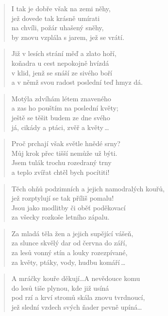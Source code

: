 \documentclass{book}
\begin{document}
\begin{verse}
I tak je dobře však na zemi něhy,\\
jež dovede tak krásně umírati\\
na chvíli, požár uhašený sněhy,\\
by znovu vzplála s jarem, jež se vrátí.
\end{verse}
\begin{verse}
Již v lesích strání měď a zlato hoří,\\
koňadra u cest nepokojně hvízdá\\
v klid, jenž se snáší ze sivého boří\\
a v němž svou radost poslední teď hmyz dá.
\end{verse}
\begin{verse}
Motýla zdvíhám létem znaveného\\
a zas ho pouštím na poslední květy;\\
ještě se těšit budem ze dne svého\\
já, cikády a ptáci, zvěř a květy\,\ldots
\end{verse}
\begin{verse}
Proč prchají však světle hnědé srny?\\
Můj krok přec tišší nemůže už býti.\\
Jsem tulák trochu rozedraný trny\\
a teplo zvířat chtěl bych pocítiti!
\end{verse}
\newpage
{}
\begin{verse}
Těch ohňů podzimních a jejich namodralých kouřů,\\
jež rozptylují se tak příliš pomalu!\\
Jsou jako modlitby či oběť poděkovací\\
za všecky rozkoše letního zápalu.
\end{verse}
\begin{verse}
Za mladá těla žen a jejich supějící vášeň,\\
za slunce skvělý dar od června do září,\\
za lesů vonný stín a louky rozezpívané,\\
za květy, ptáky, vody, hudbu komáří\,\ldots
\end{verse}
\begin{verse}
A mráčky kouře děkují\ldots A nevědouce komu\\
do lesů tiše plynou, kde již usíná\\
pod rzí a krví stromů skála znovu tvrdnoucí,\\
jež slední vzdech svých ňader pevně upíná\ldots
\end{verse}
\end{document}
